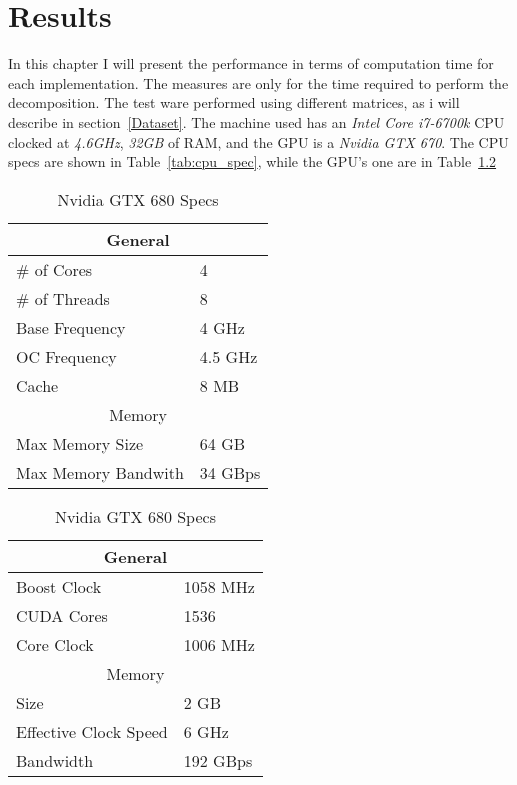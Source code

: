 \chapter{Results}
\label{results_computations}
In this chapter I will present the performance in terms of computation time for each implementation. The measures are only for the time required to perform the decomposition. The test ware performed using different matrices, as i will describe in section~\ref{Dataset}. The machine used has an \textit{Intel Core i7-6700k} CPU clocked at \textit{4.6GHz}, \textit{32GB} of RAM, and the GPU is a \textit{Nvidia GTX 670}. The CPU specs are shown in Table~\ref{tab:cpu_spec}, while the GPU's one are in Table~\ref{tab:gpu_spec}


\def \hfillx {\hspace*{-\textwidth} \hfill}
\begin{table}[H]
        \begin{minipage}{0.5\textwidth}
            \centering
\begin{tabular}{ll}
\hline
\multicolumn{2}{c}{General}                        \\ \hline
\multicolumn{1}{l|}{\# of Cores}         & 4       \\ \hline
\multicolumn{1}{l|}{\# of Threads}       & 8       \\ \hline
\multicolumn{1}{l|}{Base Frequency}      & 4 GHz   \\ \hline
\multicolumn{1}{l|}{OC Frequency}        & 4.5 GHz \\ \hline
\multicolumn{1}{l|}{Cache}               & 8 MB    \\ \hline
\multicolumn{2}{c}{Memory}                         \\ \hline
\multicolumn{1}{l|}{Max Memory Size}     & 64 GB   \\ \hline
\multicolumn{1}{l|}{Max Memory Bandwith} & 34 GBps
\end{tabular}
\caption{Intel Core i7 6700k Specs}
\label{tab:cpu_spec}
        \end{minipage}
        \hfillx
        \begin{minipage}{0.5\textwidth}
            \centering
\begin{tabular}{ll}
\hline
\multicolumn{2}{c}{General}                           \\ \hline
\multicolumn{1}{l|}{Boost Clock}           & 1058 MHz \\ \hline
\multicolumn{1}{l|}{CUDA Cores}            & 1536     \\ \hline
\multicolumn{1}{l|}{Core Clock}            & 1006 MHz \\ \hline
\multicolumn{2}{c}{Memory}                            \\ \hline
\multicolumn{1}{l|}{Size}                  & 2 GB     \\ \hline
\multicolumn{1}{l|}{Effective Clock Speed} & 6 GHz    \\ \hline
\multicolumn{1}{l|}{Bandwidth}             & 192 GBps
\end{tabular}
\caption{Nvidia GTX 680 Specs}
\label{tab:gpu_spec}
        \end{minipage}
    \end{table}

